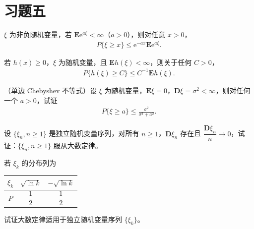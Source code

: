 \documentclass[../../main.tex]{subfiles}
\begin{document}
\section*{习题五}\label{section:ch05-习题五}

\begin{exercise}\label{exercise:ch05-01}
$\xi$ 为非负随机变量，若 $\boldsymbol{E}\mathrm{e}^{a\xi}<\infty$（$a>0$），则对任意 $x>0$，
\begin{align*}
P\{\xi\geqslant x\}\leqslant\mathrm{e}^{-ax}\boldsymbol{E}\mathrm{e}^{a\xi}.
\end{align*}
\end{exercise}

\begin{exercise}\label{exercise:ch05-02}
若 $h(x)\geqslant0$，$\xi$ 为随机变量，且 $\boldsymbol{E}h(\xi)<\infty$，则关于任何 $C>0$，
\begin{align*}
P\{h(\xi)\geqslant C\}\leqslant C^{-1}\boldsymbol{E}h(\xi).
\end{align*}
\end{exercise}

\begin{exercise}\label{exercise:ch05-03}
（单边 Chebyshev 不等式）设 $\xi$ 为随机变量，$\boldsymbol{E}\xi=0$，$\boldsymbol{D}\xi=\sigma^{2}<\infty$，则对任何一个 $a>0$，试证
\begin{align*}
P\{\xi\geqslant a\}\leqslant\frac{\sigma^{2}}{\sigma^{2}+a^{2}}.
\end{align*}
\end{exercise}

\begin{exercise}\label{exercise:ch05-04}
设 $\{\xi_n,n\geqslant1\}$ 是独立随机变量序列，对所有 $n\geqslant1$，$\boldsymbol{D}\xi_n$ 存在且 $\dfrac{\boldsymbol{D}\xi_n}{n}\to0$，试证：$\{\xi_n,n\geqslant1\}$ 服从大数定律。
\end{exercise}

\begin{exercise}\label{exercise:ch05-05}
若 $\xi_k$ 的分布列为
\begin{center}
\begin{tabular}{c|cc}
$\xi_k$ & $\sqrt{\ln k}$ & $-\sqrt{\ln k}$\\ \hline
$P$ & $\dfrac12$ & $\dfrac12$
\end{tabular}
\end{center}
试证大数定律适用于独立随机变量序列 $\{\xi_k\}$。
\end{exercise}
\end{document}
